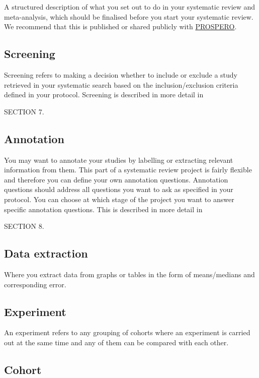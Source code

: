 \documentclass[
]{book}
\begin{document}
A structured description of what you set out to do in your systematic review and meta-analysis, which should be finalised before you start your systematic review. We recommend that this is published or shared publicly with \href{https://www.crd.york.ac.uk/prospero/}{PROSPERO}.

\hypertarget{screening}{%
\subsection{Screening}\label{screening}}

Screening refers to making a decision whether to include or exclude a study retrieved in your systematic search based on the inclusion/exclusion criteria defined in your protocol. Screening is described in more detail in

SECTION 7.

\hypertarget{annotation}{%
\subsection{Annotation}\label{annotation}}

You may want to annotate your studies by labelling or extracting relevant information from them. This part of a systematic review project is fairly flexible and therefore you can define your own annotation questions. Annotation questions should address all questions you want to ask as specified in your protocol. You can choose at which stage of the project you want to answer specific annotation questions. This is described in more detail in

SECTION 8.

\hypertarget{data-extraction}{%
\subsection{Data extraction}\label{data-extraction}}

Where you extract data from graphs or tables in the form of means/medians and corresponding error.

\hypertarget{experiment}{%
\subsection{Experiment}\label{experiment}}

An experiment refers to any grouping of cohorts where an experiment is carried out at the same time and any of them can be compared with each other.

\hypertarget{cohort}{%
\subsection{Cohort}\label{cohort}}
\end{document}
